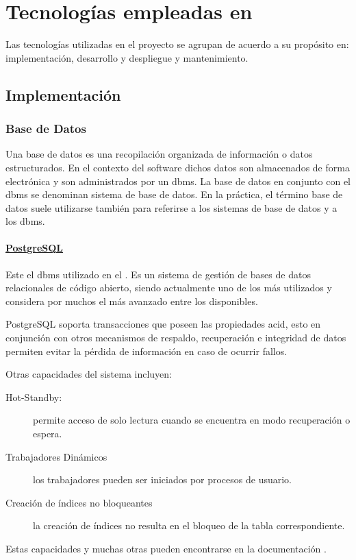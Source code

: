 \section{Tecnologías empleadas en \SIOSU}\label{sec:tecnologias}

Las tecnologías utilizadas en el proyecto se agrupan de acuerdo a su propósito en: implementación, desarrollo y despliegue y mantenimiento. 

\subsection{Implementación}

\subsubsection{Base de Datos}
Una base de datos es una recopilación organizada de información o datos
estructurados. En el contexto del software dichos datos son almacenados de forma electrónica y son administrados por un \acrfull{dbms}. La base de datos en conjunto con el \acrshort{dbms} se denominan sistema de base de datos. En la práctica, el término base de datos suele utilizarse también para referirse a los sistemas de base de datos y a los \acrshort{dbms}.

\paragraph{\href{https://www.postgresql.org/}{PostgreSQL}}
Este el \acrshort{dbms} utilizado en el \SIOSU. Es un sistema de gestión de bases de datos relacionales de código abierto, siendo actualmente uno de los más utilizados y considera por muchos el más avanzado entre los disponibles.

PostgreSQL soporta transacciones que poseen las propiedades \acrfull{acid}, esto en conjunción con otros mecanismos de respaldo, recuperación e integridad de datos permiten evitar la pérdida de información en caso de ocurrir fallos.

Otras capacidades del sistema incluyen:
\begin{description}
    \item[Hot-Standby:] permite acceso de solo lectura cuando se encuentra en modo recuperación o espera.
    \item[Trabajadores Dinámicos] los trabajadores pueden ser iniciados por procesos de usuario.
    \item[Creación de índices no bloqueantes] la creación de índices no resulta en el bloqueo de la tabla correspondiente.
\end{description}
Estas capacidades y muchas otras pueden encontrarse en la documentación \cite{postgreFeatures}.

